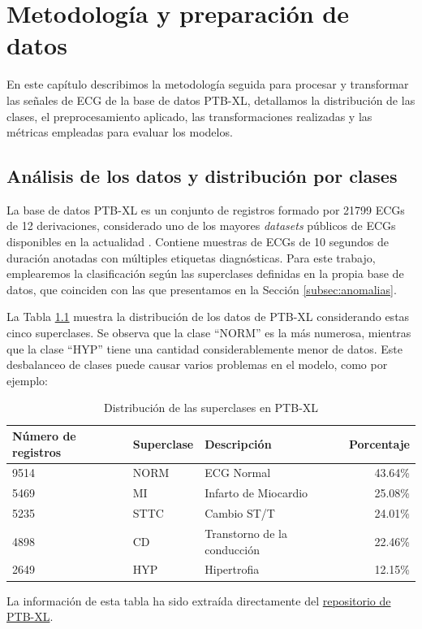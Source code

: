\chapter{Metodología y preparación de datos}
\label{cap:pre_datos}
\begin{resumen}
	En este capítulo describimos la metodología seguida para procesar y transformar las señales de ECG de la base de datos PTB-XL, detallamos la distribución de las clases, el preprocesamiento aplicado, las transformaciones realizadas y las métricas empleadas para evaluar los modelos.
\end{resumen}

\section{Análisis de los datos y distribución por clases}
La base de datos PTB-XL es un conjunto de registros formado por 21799 ECGs de 12 derivaciones, considerado uno de los mayores \emph{datasets} públicos de ECGs disponibles en la actualidad \citep{ptbxlart}. Contiene muestras de ECGs de 10 segundos de duración anotadas con múltiples etiquetas diagnósticas. Para este trabajo, emplearemos la clasificación según las superclases definidas en la propia base de datos, que coinciden con las que presentamos en la Sección \ref{subsec:anomalias}.

La Tabla \ref{tab:dist} muestra la distribución de los datos de PTB-XL considerando estas cinco superclases. Se observa que la clase ``NORM'' es la más numerosa, mientras que la clase ``HYP'' tiene una cantidad considerablemente menor de datos. Este desbalanceo de clases puede causar varios problemas en el modelo, como por ejemplo:

\begin{table}[t]
	\centering
	\begin{tabular}{|lllr|}
		\hline
		Número de registros & Superclase & Descripción & Porcentaje \\
		\hline
		9514 & NORM & ECG Normal & 43.64\% \\
		5469 & MI & Infarto de Miocardio & 25.08\% \\
		5235 & STTC & Cambio ST/T & 24.01\% \\
		4898 & CD & Transtorno de la conducción & 22.46\% \\
		2649 & HYP & Hipertrofia & 12.15\% \\
		\hline
		
	\end{tabular}
	\caption{Distribución de las superclases en PTB-XL}
	\label{tab:dist}
	\begin{tablenotes}
		\small
		\item La información de esta tabla ha sido extraída directamente del \href{https://physionet.org/content/ptb-xl/1.0.3/}{repositorio de PTB-XL}.
	\end{tablenotes}
\end{table}

